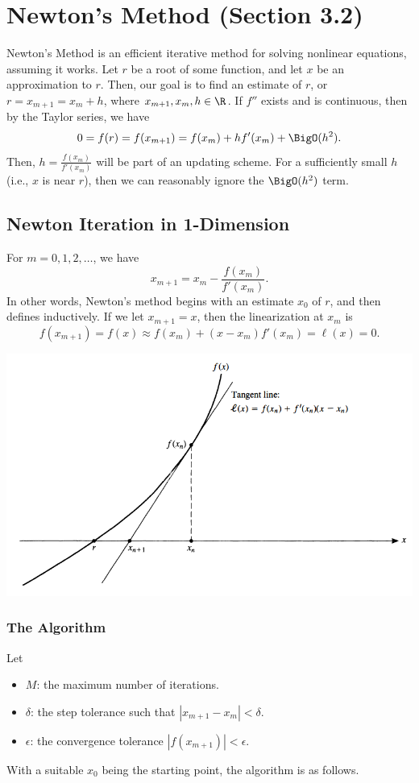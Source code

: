 \documentclass[letterpaper]{article}
\begin{document}
\section{Newton's Method (Section 3.2)}
Newton's Method is an efficient iterative method for solving nonlinear equations, assuming it works. Let $r$ be a root of some function, and let $x$ be an approximation to $r$. Then, our goal is to find an estimate of $r$, or $r = x_{m + 1} = x_m + h$, where $x_{m + 1}, x_m, h \in \R$. If $f''$ exists and is continuous, then by the Taylor series, we have 
\[0 = f(r) = f(x_{m + 1}) = f(x_m) + hf'(x_m) + \BigO(h^2).\]
Then, $h = \frac{f(x_m)}{f'(x_m)}$ will be part of an updating scheme. For a sufficiently small $h$ (i.e., $x$ is near $r$), then we can reasonably ignore the $\BigO(h^2)$ term. 

\subsection{Newton Iteration in 1-Dimension}
For $m = 0, 1, 2, \hdots$, we have 
\[x_{m + 1} = x_m - \frac{f(x_m)}{f'(x_m)}.\]
In other words, Newton's method begins with an estimate $x_0$ of $r$, and then defines inductively. If we let $x_{m + 1} = x$, then the linearization at $x_m$ is 
\[f(x_{m + 1}) = f(x) \approx f(x_m) + (x - x_m) f'(x_m) = \ell(x) = 0.\]
\begin{center}
    \includegraphics[scale=0.6]{../assets/geometric_newton.png}
\end{center}

\subsubsection{The Algorithm}
Let
\begin{itemize}
    \item $M$: the maximum number of iterations. 
    \item $\delta$: the step tolerance such that $|x_{m + 1} - x_m| < \delta$. 
    \item $\epsilon$: the convergence tolerance $|f(x_{m + 1})| < \epsilon$.
\end{itemize}
With a suitable $x_0$ being the starting point, the algorithm is as follows.
\end{document}
